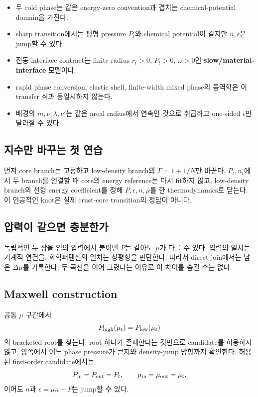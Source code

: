 \documentclass[
  10pt,
  a4paper,
]{article}
\providecommand{\tightlist}{%
  \setlength{\itemsep}{0pt}\setlength{\parskip}{0pt}}
\begin{document}
\begin{itemize}
\tightlist
\item
  두 cold phase는 같은 energy-zero convention과 겹치는
  chemical-potential domain을 가진다.
\item
  sharp transition에서는 평형 pressure \(P_t\)와 chemical potential이
  같지만 \(n,\epsilon\)은 jump할 수 있다.
\item
  진동 interface contract는 finite radius \(r_t>0\), \(P_t>0\),
  \(\omega>0\)인 \textbf{slow/material-interface} 모델이다.
\item
  rapid phase conversion, elastic shell, finite-width mixed phase의
  동역학은 이 transfer 식과 동일시하지 않는다.
\item
  배경의 \(m,\nu,\lambda,\nu'\)는 같은 areal radius에서 연속인 것으로
  취급하고 one-sided \(\epsilon\)만 달라질 수 있다.
\end{itemize}

\subsection{지수만 바꾸는 첫
연습}\label{uxc9c0uxc218uxb9cc-uxbc14uxafb8uxb294-uxccab-uxc5f0uxc2b5}

먼저 core branch는 고정하고 low-density branch의 \(\Gamma=1+1/N\)만
바꾼다. \(P_t,n_t\)에서 두 branch를 연결할 때 core의 energy reference는
다시 fit하지 않고, low-density branch의 선형 energy coefficient를 정해
\(P,\epsilon,n,\mu\)를 한 thermodynamics로 닫는다. 이 인공적인 knot은
실제 crust-core transition의 정답이 아니다.

\subsection{압력이 같으면
충분한가}\label{uxc555uxb825uxc774-uxac19uxc73cuxba74-uxcda9uxbd84uxd55cuxac00}

독립적인 두 상을 임의 압력에서 붙이면 \(P\)는 같아도 \(\mu\)가 다를 수
있다. 압력의 일치는 기계적 연결을, 화학퍼텐셜의 일치는 상평형을
판단한다. 따라서 direct join에서는 남은 \(\Delta\mu\)를 기록한다. 두
곡선을 이어 그렸다는 이유로 이 차이를 숨길 수는 없다.

\subsection{Maxwell construction}\label{maxwell-construction}

공통 \(\mu\) 구간에서 \[
P_{\rm high}(\mu_t)=P_{\rm low}(\mu_t)
\] 의 bracketed root를 찾는다. root 하나가 존재한다는 것만으로
candidate를 허용하지 않고, 양쪽에서 어느 phase pressure가 큰지와
density-jump 방향까지 확인한다. 허용된 first-order candidate에서는 \[
P_{\rm in}=P_{\rm out}=P_t,\qquad \mu_{\rm in}=\mu_{\rm out}=\mu_t,
\] 이어도 \(n\)과 \(\epsilon=\mu n-P\)는 jump할 수 있다.
\end{document}
